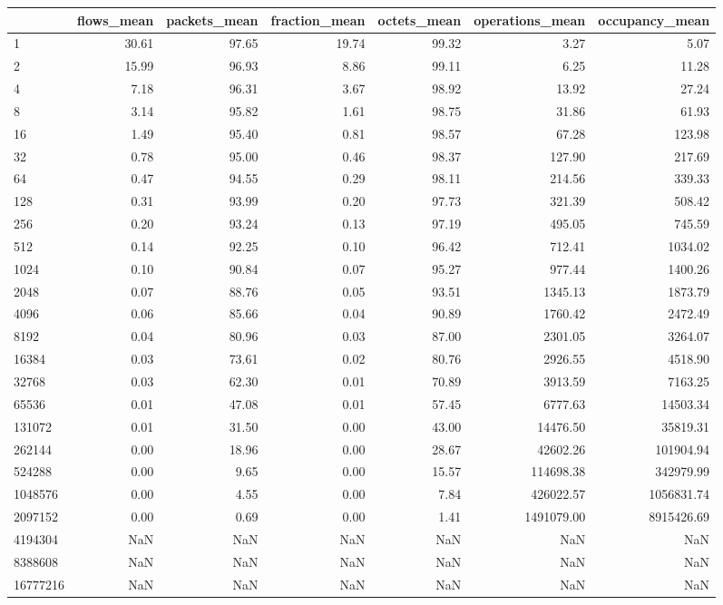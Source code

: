 \begin{tabular}{lrrrrrr}
\toprule
 & flows_mean & packets_mean & fraction_mean & octets_mean & operations_mean & occupancy_mean \\
\midrule
1 & 30.61 & 97.65 & 19.74 & 99.32 & 3.27 & 5.07 \\
2 & 15.99 & 96.93 & 8.86 & 99.11 & 6.25 & 11.28 \\
4 & 7.18 & 96.31 & 3.67 & 98.92 & 13.92 & 27.24 \\
8 & 3.14 & 95.82 & 1.61 & 98.75 & 31.86 & 61.93 \\
16 & 1.49 & 95.40 & 0.81 & 98.57 & 67.28 & 123.98 \\
32 & 0.78 & 95.00 & 0.46 & 98.37 & 127.90 & 217.69 \\
64 & 0.47 & 94.55 & 0.29 & 98.11 & 214.56 & 339.33 \\
128 & 0.31 & 93.99 & 0.20 & 97.73 & 321.39 & 508.42 \\
256 & 0.20 & 93.24 & 0.13 & 97.19 & 495.05 & 745.59 \\
512 & 0.14 & 92.25 & 0.10 & 96.42 & 712.41 & 1034.02 \\
1024 & 0.10 & 90.84 & 0.07 & 95.27 & 977.44 & 1400.26 \\
2048 & 0.07 & 88.76 & 0.05 & 93.51 & 1345.13 & 1873.79 \\
4096 & 0.06 & 85.66 & 0.04 & 90.89 & 1760.42 & 2472.49 \\
8192 & 0.04 & 80.96 & 0.03 & 87.00 & 2301.05 & 3264.07 \\
16384 & 0.03 & 73.61 & 0.02 & 80.76 & 2926.55 & 4518.90 \\
32768 & 0.03 & 62.30 & 0.01 & 70.89 & 3913.59 & 7163.25 \\
65536 & 0.01 & 47.08 & 0.01 & 57.45 & 6777.63 & 14503.34 \\
131072 & 0.01 & 31.50 & 0.00 & 43.00 & 14476.50 & 35819.31 \\
262144 & 0.00 & 18.96 & 0.00 & 28.67 & 42602.26 & 101904.94 \\
524288 & 0.00 & 9.65 & 0.00 & 15.57 & 114698.38 & 342979.99 \\
1048576 & 0.00 & 4.55 & 0.00 & 7.84 & 426022.57 & 1056831.74 \\
2097152 & 0.00 & 0.69 & 0.00 & 1.41 & 1491079.00 & 8915426.69 \\
4194304 & NaN & NaN & NaN & NaN & NaN & NaN \\
8388608 & NaN & NaN & NaN & NaN & NaN & NaN \\
16777216 & NaN & NaN & NaN & NaN & NaN & NaN \\
\bottomrule
\end{tabular}
